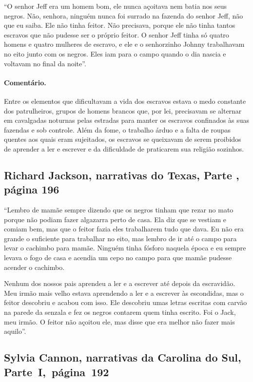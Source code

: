 ``O senhor Jeff era um homem bom, ele nunca açoitava nem batia nos seus
negros. Não, senhora, ninguém nunca foi surrado na fazenda do senhor
Jeff, não que eu saiba. Ele não tinha feitor. Não precisava, porque ele
não tinha tantos escravos que não pudesse ser o próprio feitor. O senhor
Jeff tinha só quatro homens e quatro mulheres de escravo, e ele e o
senhorzinho Johnny trabalhavam no eito junto com os negros. Eles iam para
o campo quando o dia nascia e voltavam no final da noite''.

\paragraph{Comentário.}\quad
{\small
Entre os elementos que dificultavam a vida dos escravos estava o
medo constante dos patrulheiros, grupos de homens brancos que, por lei,
precisavam se alternar em cavalgadas noturnas pelas estradas para manter
os escravos confinados às suas fazendas e sob controle. Além da fome, o
trabalho árduo e a falta de roupas quentes aos quais eram sujeitados, os
escravos se queixavam de serem proibidos de aprender a ler e escrever e
da dificuldade de praticarem sua religião sozinhos.
}

\subsection{Richard Jackson, narrativas do Texas, Parte , página 196}
\label{ref162}

``Lembro de mamãe sempre dizendo que os negros tinham que rezar no mato
porque não podiam fazer algazarra perto de casa. Ela diz que se vestiam
e comiam bem, mas que o feitor fazia eles trabalharem tudo que dava. Eu
não era grande o suficiente para trabalhar no eito, mas lembro de ir até
o campo para levar o cachimbo para mamãe. Ninguém tinha fósforo naquela
época e eu sempre levava o fogo de casa e acendia um cepo no campo para
que mamãe pudesse acender o cachimbo.

Nenhum dos nossos pais aprendeu a ler e a escrever até depois da
escravidão. Meu irmão mais velho estava aprendendo a ler e a escrever às
escondidas, mas o feitor descobriu e acabou com isso. Ele descobriu umas
letras escritas com carvão na parede da senzala e fez os negros contarem
quem tinha escrito. Foi o Jack, meu irmão. O feitor não açoitou ele, mas
disse que era melhor não fazer mais aquilo''.

\subsection{Sylvia Cannon, narrativas da Carolina do Sul, Parte~I,~página~192} \label{ref45}

